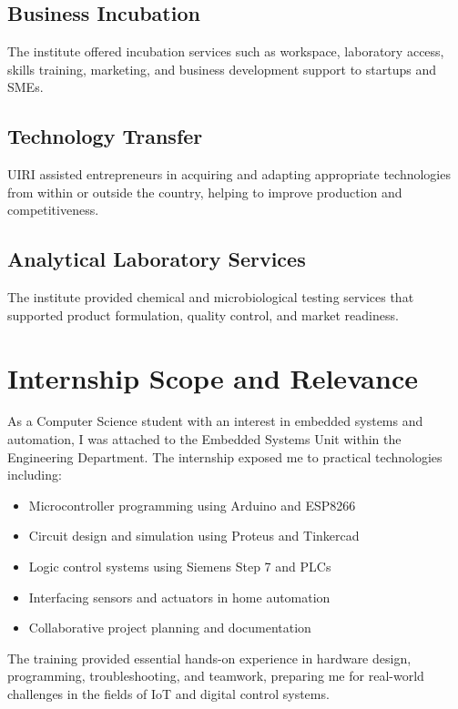 \documentclass[12pt,a4paper]{report}
\begin{document}
\subsection{Business Incubation}
\noindent The institute offered incubation services such as workspace, laboratory access, skills training, marketing, and business development support to startups and SMEs.

\subsection{Technology Transfer}
\noindent UIRI assisted entrepreneurs in acquiring and adapting appropriate technologies from within or outside the country, helping to improve production and competitiveness.

\subsection{Analytical Laboratory Services}
\noindent The institute provided chemical and microbiological testing services that supported product formulation, quality control, and market readiness.

\newpage
\section{Internship Scope and Relevance}
\noindent As a Computer Science student with an interest in embedded systems and automation, I was attached to the Embedded Systems Unit within the Engineering Department. The internship exposed me to practical technologies including:
\begin{itemize}
    \item Microcontroller programming using Arduino and ESP8266
    \item Circuit design and simulation using Proteus and Tinkercad
    \item Logic control systems using Siemens Step 7 and PLCs
    \item Interfacing sensors and actuators in home automation
    \item Collaborative project planning and documentation
\end{itemize}

\noindent The training provided essential hands-on experience in hardware design, programming, troubleshooting, and teamwork, preparing me for real-world challenges in the fields of IoT and digital control systems.
\end{document}
